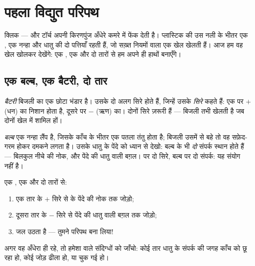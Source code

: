 \chapter{पहला विद्युत परिपथ}\label{ch:g3:first-electric-circuit}

क्लिक --- और टॉर्च अपनी किरणपुंज अँधेरे कमरे में फेंक देती है।
प्लास्टिक की उस नली के भीतर एक , एक नन्हा  और धातु की दो
पत्तियाँ रहती हैं, जो सख़्त नियमों वाला एक खेल खेलती हैं। आज हम वह
खेल खोलकर देखेंगे: एक , एक  और दो तारों से हम अपने ही हाथों
 बनाएँगे।

\section{एक बल्ब, एक बैटरी, दो तार}

\begin{definition}[बैटरी]\label{def:g3:first-electric-circuit:battery}
\emph{बैटरी} बिजली का एक छोटा भंडार है। उसके दो अलग सिरे
होते हैं, जिन्हें उसके \emph{सिरे} कहते हैं: एक पर $+$
(धन) का निशान होता है, दूसरे पर $-$ (ऋण) का। दोनों सिरे ज़रूरी हैं
--- बिजली तभी खेलती है जब दोनों खेल में शामिल हों।
\end{definition}

\begin{definition}[बल्ब]\label{def:g3:first-electric-circuit:bulb}
\emph{बल्ब} एक नन्हा लैंप है, जिसके काँच के भीतर एक पतला
तंतु होता है; बिजली उसमें से बहे तो वह सफ़ेद-गरम होकर दमकने लगता है।
उसके धातु के पेंदे को ध्यान से देखो: बल्ब के भी \emph{दो} संपर्क
स्थान होते हैं --- बिलकुल नीचे की नोक, और पेंदे की धातु वाली बग़ल।
 पर दो सिरे, बल्ब पर दो संपर्क: यह संयोग नहीं है।
\end{definition}

\begin{method}[बल्ब जलाना]\label{met:g3:first-electric-circuit:light}
एक , एक  और दो तारों से:
\begin{enumerate}
  \item एक तार  के $+$ सिरे से  के पेंदे की नोक तक जोड़ो;
  \item दूसरा तार  के $-$ सिरे से पेंदे की धातु वाली बग़ल तक
        जोड़ो;
  \item {} जल उठता है --- तुमने परिपथ बना लिया!
\end{enumerate}
अगर वह अँधेरा ही रहे, तो हमेशा वाले संदिग्धों को जाँचो: कोई तार धातु
के संपर्क की जगह काँच को छू रहा हो, कोई जोड़ ढीला हो, या  चुक
गई हो।
\end{method}

